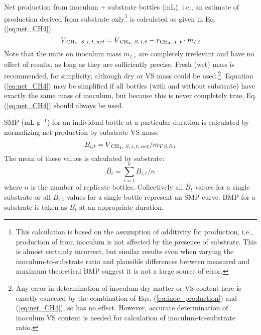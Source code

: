 \documentclass[]{article}
\begin{document}
Net  production from inoculum + substrate bottles (mL), i.e., an estimate of  production derived from substrate only\footnote{This calculation is based on the assumption of additivity for  production, i.e., production of  from inoculum is not affected by the presence of substrate. This is almost certainly incorrect, but similar results even when varying the inoculum-to-substrate ratio and plausible differences between measured and maximum theoretical BMP suggest it is not a large source of error.} is calculated as given in Eq. (\ref{eq:net_CH4}).
\begin{equation}
  \label{eq:net_CH4}
  V\textsubscript{CH$_4$, $S, i, t, net$} = V\textsubscript{CH$_4$, $S, i, t$} - \bar{v}\textsubscript{{CH$_4$, $I, t$}} \cdot m_{I, i}
\end{equation}
Note that the units on inoculum mass $m_{I, i}$ are completely irrelevant and have no effect of results, as long as they are sufficiently precise.
Fresh (wet) mass is recommended, for simplicity, although dry or VS mass could be used.\footnote{Any error in determination of inoculum dry matter or VS content here is exactly canceled by the combination of Eqs. (\ref{eq:inoc_production}) and (\ref{eq:net_CH4}), so has no effect. However, accurate determination of inoculum VS content is needed for calculation of inoculum-to-substrate ratio.}.
Equation (\ref{eq:net_CH4}) may be simplified if all bottles (with and without substrate) have exactly the same mass of inoculum, but because this is never completely true, Eq. (\ref{eq:net_CH4}) should always be used. 

SMP (mL g$^{-1}$) for an individual bottle at a particular duration is calculated by normalizing net  production by substrate VS mass:
\begin{equation}
  \label{eq:yield}
  B_{i, t} = V\textsubscript{CH$_4$, $S, i, t, net$} / m_{VS, S, i}
\end{equation}
The mean of these values is calculated by substrate:
\begin{equation}
  \label{eq:BMP}
  \bar{B_t} = \sum_{i = 1} ^n B_{i, t} / n
\end{equation}
where $n$ is the number of replicate bottles.
Collectively all $\bar{B_t}$ values for a single substrate or all $B_{i, t}$ values for a single bottle represent an SMP curve.
BMP for a substrate is taken as $\bar{B_t}$ at an appropriate duration.
\end{document}
